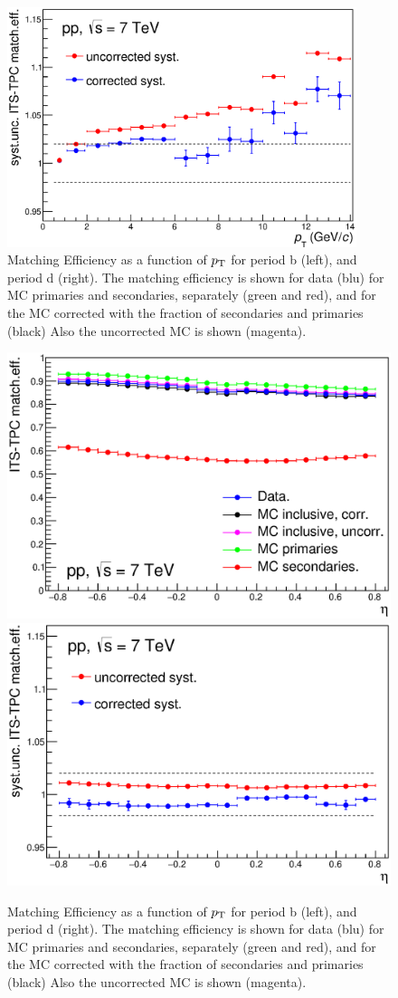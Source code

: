 \begin{figure}[!htb]
\begin{center}
\includegraphics[height=7cm]{FigCap4/ITSTPCmatchEffSyst_10bpass4_vsPt.eps}
\caption{Matching Efficiency as a function of $p_{\rm T}$ for period b (left), and period d (right). The matching efficiency is shown for data (blu) for MC primaries and secondaries, separately (green and red), and for the MC corrected with the fraction of secondaries and primaries (black) Also the uncorrected MC is shown (magenta). }
\label{fig:CorrMatchEffVsPt}
\end{center}
\end{figure}

\begin{figure}[!htb]
\begin{center}
\includegraphics[width=.49\textwidth]{FigCap4/ITSTPCmatchEff_10bpass4_vsEta.eps}
\includegraphics[width=.49\textwidth]{FigCap4/ITSTPCmatchEffSyst_10bpass4_vsEta.eps}
\caption{Matching Efficiency as a function of $p_{\rm T}$ for period b (left), and period d (right). The matching efficiency is shown for data (blu) for MC primaries and secondaries, separately (green and red), and for the MC corrected with the fraction of secondaries and primaries (black) Also the uncorrected MC is shown (magenta). }
\label{fig:CorrMatchEffVsEta}
\end{center}
\end{figure}


